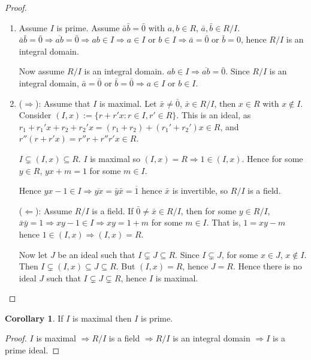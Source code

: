 \documentclass[12pt,a4paper]{article}
\theoremstyle{definition}
\newtheorem{corollary}[definition]{Corollary}
\begin{document}
\begin{proof}
	\hfill
	\begin{enumerate}
		\item Assume $I$ is prime. Assume $\bar{a}\bar{b} = \bar{0}$ with $a, b \in R$, $\bar{a}, \bar{b} \in R / I$. $\bar{a}\bar{b} = \bar{0} \Rightarrow \overline{ab} = \bar{0} \Rightarrow ab \in I \Rightarrow a \in I \text{ or } b \in I \Rightarrow \bar{a} = \bar{0} \text{ or } \bar{b} = {0}$, hence $R / I$ is an integral domain.
		
		Now assume $R / I$ is an integral domain. $ab \in I \Rightarrow \overline{ab} = \bar{0}$. Since $R / I$ is an integral domain, $\bar{a} = \bar{0}$ or $\bar{b} = \bar{0} \Rightarrow a \in I \text{ or } b \in I$.

		\item ($\Rightarrow$): Assume that $I$ is maximal. Let $\bar{x} \ne \bar{0}$, $\bar{x} \in R / I$, then $x \in R$ with $x \notin I$. Consider $(I, x) := \{ r + r'x: r \in I, r' \in R \}$. This is an ideal, as $r_1 + r_1' x + r_2 + r_2'x = (r_1 + r_2) + (r_1' + r_2')x \in R$, and $r'' (r + r'x) = r''r + r''r'x \in R$.
		
		$I \subsetneq (I, x) \subseteq R$. $I$ is maximal so $(I, x) = R \Rightarrow 1 \in (I, x)$. Hence for some $y \in R$, $yx + m = 1$ for some $m \in I$.

		Hence $yx - 1 \in I \Rightarrow \overline{yx} = \bar{y}\bar{x} = \overline{1}$ hence $\bar{x}$ is invertible, so $R / I$ is a field.

		($\Leftarrow$): Assume $R / I$ is a field. If $\bar{0} \ne \bar{x} \in R / I$, then for some $y \in R / I$, $\bar{x} \bar{y} = 1 \Rightarrow xy - 1 \in I \Rightarrow xy = 1 + m$ for some $m \in I$. That is, $1 = xy - m$ hence $1 \in (I, x) \Rightarrow (I, x) = R$.

		Now let $J$ be an ideal such that $I \subsetneq J \subseteq R$. Since $I \subsetneq J$, for some $x \in J$, $x \notin I$. Then $I \subsetneq (I, x) \subseteq J \subseteq R$. But $(I, x) = R$, hence $J = R$. Hence there is no ideal $J$ such that $I \subsetneq J \subsetneq R$, hence $I$ is maximal.
	\end{enumerate}
\end{proof}

\begin{corollary}
	If $I$ is maximal then $I$ is prime.
\end{corollary}

\begin{proof}
	$I$ is maximal $\Rightarrow R / I$ is a field $\Rightarrow R / I$ is an integral domain $\Rightarrow I$ is a prime ideal.
\end{proof}
\end{document}
